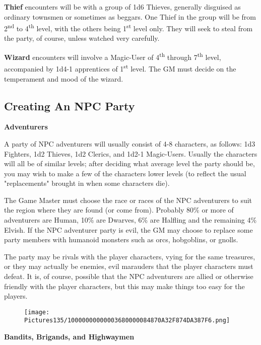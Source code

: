 \documentclass[a4paper,twoside,openany,10pt]{book}
\begin{document}
\begin{multicols}{2}
\textbf{Thief} encounters will be with a group of 1d6 Thieves, generally disguised as ordinary townsmen or sometimes as beggars. One Thief in the group will be from 2\textsuperscript{nd} to 4\textsuperscript{th} level, with the others being 1\textsuperscript{st} level only. They will seek to steal from the party, of course, unless watched very carefully. 

\textbf{Wizard }encounters will involve a Magic-User of 4\textsuperscript{th} through 7\textsuperscript{th} level, accompanied by 1d4-1 apprentices of 1\textsuperscript{st} level. The GM must decide on the temperament and mood of the wizard.

\subsection{Creating An NPC Party}\label{creating-an-npc-party}

\textbf{Adventurers}

A party of NPC adventurers will usually consist of 4-8 characters, as follows: 1d3 Fighters, 1d2 Thieves, 1d2 Clerics, and 1d2-1 Magic-Users. Usually the characters will all be of similar levels; after deciding what average level the party should be, you may wish to make a few of the characters lower levels (to reflect the usual "replacements" brought in when some characters die).

The Game Master must choose the race or races of the NPC adventurers to suit the region where they are found (or come from). Probably 80\% or more of adventurers are Human, 10\% are Dwarves, 6\% are Halfling and the remaining 4\% Elvish. If the NPC adventurer party is evil, the GM may choose to replace some party members with humanoid monsters such as orcs, hobgoblins, or gnolls.

The party may be rivals with the player characters, vying for the same treasures, or they may actually be enemies, evil marauders that the player characters must defeat. It is, of course, possible that the NPC adventurers are allied or otherwise friendly with the player characters, but this may make things too easy for the players.

\begin{wrapfigure}{r}{0.25\textwidth}
	\texttt{[image: Pictures135/10000000000003680000084870A32F874DA387F6.png]} 
\end{wrapfigure}

\textbf{Bandits, Brigands, and Highwaymen}


\end{multicols}
\end{document}
